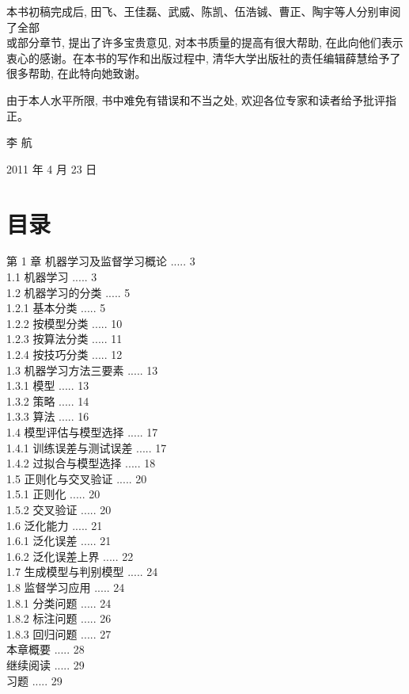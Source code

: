 \documentclass[10pt]{article}
\begin{document}
\begin{CJK*}{UTF8}{bsmi}
本书初稿完成后, 田飞、王佳磊、武威、陈凯、伍浩铖、曹正、陶宇等人分别审阅了全部\\
或部分章节, 提出了许多宝贵意见, 对本书质量的提高有很大帮助, 在此向他们表示衷心的感谢。在本书的写作和出版过程中, 清华大学出版社的责任编辑薛慧给予了很多帮助, 在此特向她致谢。

由于本人水平所限, 书中难免有错误和不当之处, 欢迎各位专家和读者给予批评指正。

李 航

2011 年 4 月 23 日

\section*{目录}
第 1 章 机器学习及监督学习概论 ..... 3\\
1.1 机器学习 ..... 3\\
1.2 机器学习的分类 ..... 5\\
1.2.1 基本分类 ..... 5\\
1.2.2 按模型分类 ..... 10\\
1.2.3 按算法分类 ..... 11\\
1.2.4 按技巧分类 ..... 12\\
1.3 机器学习方法三要素 ..... 13\\
1.3.1 模型 ..... 13\\
1.3.2 策略 ..... 14\\
1.3.3 算法 ..... 16\\
1.4 模型评估与模型选择 ..... 17\\
1.4.1 训练误差与测试误差 ..... 17\\
1.4.2 过拟合与模型选择 ..... 18\\
1.5 正则化与交叉验证 ..... 20\\
1.5.1 正则化 ..... 20\\
1.5.2 交叉验证 ..... 20\\
1.6 泛化能力 ..... 21\\
1.6.1 泛化误差 ..... 21\\
1.6.2 泛化误差上界 ..... 22\\
1.7 生成模型与判别模型 ..... 24\\
1.8 监督学习应用 ..... 24\\
1.8.1 分类问题 ..... 24\\
1.8.2 标注问题 ..... 26\\
1.8.3 回归问题 ..... 27\\
本章概要 ..... 28\\
继续阅读 ..... 29\\
习题 ..... 29\\

\end{CJK*}
\end{document}
